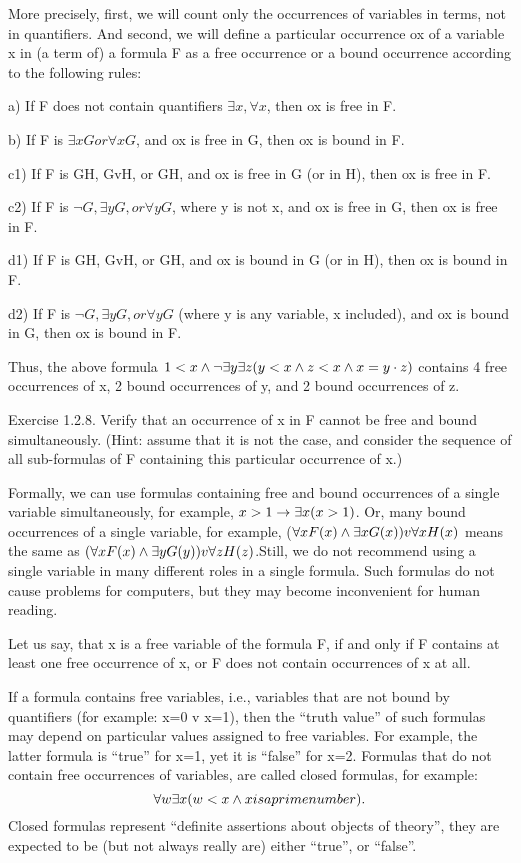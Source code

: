 More precisely, first, we will count only the occurrences of variables in terms, not in quantifiers. And second, we will define a particular occurrence ox of a variable x in (a term of) a formula F as a free occurrence or a bound occurrence according to the following rules:

a) If F does not contain quantifiers \(\exists x, \forall x\), then ox is free in F.

b) If F is \(\exists xG or \forall xG\), and ox is free in G, then ox is bound in F.

c1) If F is G\AND H, GvH, or G\IMPLIES H, and ox is free in G (or in H), then ox is free in F.

c2) If F is \(\neg G, \exists yG, or \forall yG\), where y is not x, and ox is free in G, then ox is free in F.

d1) If F is G\AND H, GvH, or G\IMPLIES H, and ox is bound in G (or in H), then ox is bound in F.

d2) If F is \(\neg G, \exists yG, or \forall yG\) (where y is any variable, x included), and ox is bound in G, then ox is bound in F.

Thus, the above formula \(1<x \wedge  \neg \exists y\exists z(y<x \wedge  z<x \wedge  x=y\cdot z)\) contains 4 free occurrences of x, 2 bound occurrences of y, and 2 bound occurrences of z.

Exercise 1.2.8. Verify that an occurrence of x in F cannot be free and bound simultaneously. (Hint: assume that it is not the case, and consider the sequence of all sub-formulas of F containing this particular occurrence of x.)

Formally, we can use formulas containing free and bound occurrences of a single variable simultaneously, for example, \(x>1\rightarrow \exists x(x>1)\). Or, many bound occurrences of a single variable, for example, (\(\forall xF(x) \wedge \exists xG(x)) v \forall xH(x)\) means the same as \((\forall xF(x) \wedge  \exists yG(y)) v \forall zH(z) \).Still, we do not recommend using a single variable in many different roles in a single formula. Such formulas do not cause problems for computers, but they may become inconvenient for human reading.

Let us say, that x is a free variable of the formula F, if and only if F contains at least one free occurrence of x, or F does not contain occurrences of x at all.

If a formula contains free variables, i.e., variables that are not bound by quantifiers (for example: x=0 v x=1), then the ``truth value'' of such formulas may depend on particular values assigned to free variables.  For example, the latter formula is ``true'' for x=1, yet it is ``false'' for x=2. Formulas that do not contain free occurrences of variables, are called closed formulas, for example:
\[
\forall w\exists x( w<x \wedge  x is a prime number).
\]
Closed formulas represent ``definite assertions about objects of theory'', they are expected to be (but not always really are) either ``true'', or ``false''.

